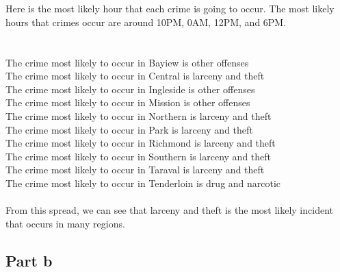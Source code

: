\documentclass[paper=a4, fontsize=11pt]{scrartcl} %
\numberwithin{equation}{section} %
\numberwithin{figure}{section} %
\numberwithin{table}{section} %
\begin{document}
	\\\\
	Here is the most likely hour that each crime is going to occur. The most likely hours that crimes occur are around 10PM, 0AM, 12PM, and 6PM.
	\\\\\\
	The crime most likely to occur in Bayiew is other offenses\\
	The crime most likely to occur in Central is larceny and theft\\
	The crime most likely to occur in Ingleside is other offenses\\
	The crime most likely to occur in Mission is other offenses\\
	The crime most likely to occur in Northern is larceny and theft\\
	The crime most likely to occur in Park is larceny and theft\\
	The crime most likely to occur in Richmond is larceny and theft\\
	The crime most likely to occur in Southern is larceny and theft\\
	The crime most likely to occur in Taraval is larceny and theft\\
	The crime most likely to occur in Tenderloin is drug and narcotic
	\\\\From this spread, we can see that larceny and theft is the most likely incident that occurs in many regions.
	
	\newpage
	\subsection{Part b}
	
\end{document}
